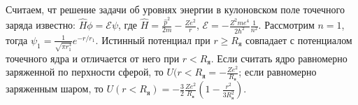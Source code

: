 \documentclass[a4paper]{article}
\begin{document}
\begin{sol}
Считаем, чт решение задачи об уровнях энергии в кулоновском поле
точечного заряда известно: $\hat{H} \phi = \mathcal{E} \psi$, где
$\hat{H} = \frac{\hat{p}^2}{2m}-\frac{Ze^2}{r}$, $\mathcal{E}=
-\frac{Z^2 m e^4}{2\hbar^2} \frac{1}{n^2}$. Рассмотрим $n=1$,
тогда $\psi_1= \frac{1}{\sqrt{\pi r_1^3} } e^{-r /r_1}$. Истинный
потенциал при $r \ge R_\text{я}$ совпадает с потенциалом точечного
ядра и отличается от него при $r< R_\text{я}$. Если считать ядро
равномерно заряженной по перхности сферой, то $U(r< R_\text{я}=
-\frac{Ze^2}{R_\text{я}}$; если равномерно заряженным шаром, то
$U(r<R_\text{я})= - \frac{3}{2} \frac{Ze^2}{R_{\text{я}}}\left( 
1- \frac{r^2}{3R_\text{я}^2}\right) $.


\end{sol}
\end{document}
